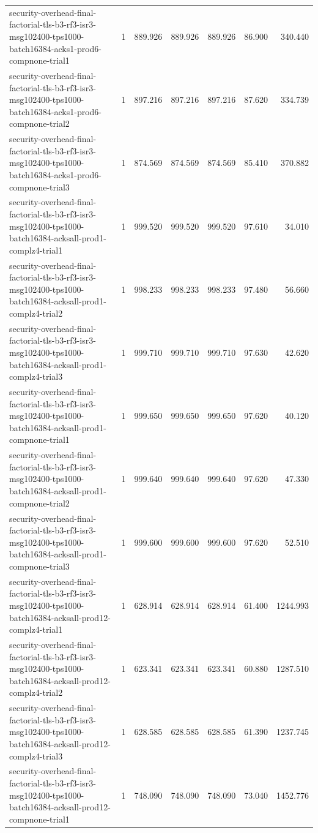 \begin{tabular}{lrrrrrr}
security-overhead-final-factorial-tls-b3-rf3-isr3-msg102400-tps1000-batch16384-acks1-prod6-compnone-trial1 & 1 & 889.926 & 889.926 & 889.926 & 86.900 & 340.440 \\
security-overhead-final-factorial-tls-b3-rf3-isr3-msg102400-tps1000-batch16384-acks1-prod6-compnone-trial2 & 1 & 897.216 & 897.216 & 897.216 & 87.620 & 334.739 \\
security-overhead-final-factorial-tls-b3-rf3-isr3-msg102400-tps1000-batch16384-acks1-prod6-compnone-trial3 & 1 & 874.569 & 874.569 & 874.569 & 85.410 & 370.882 \\
security-overhead-final-factorial-tls-b3-rf3-isr3-msg102400-tps1000-batch16384-acksall-prod1-complz4-trial1 & 1 & 999.520 & 999.520 & 999.520 & 97.610 & 34.010 \\
security-overhead-final-factorial-tls-b3-rf3-isr3-msg102400-tps1000-batch16384-acksall-prod1-complz4-trial2 & 1 & 998.233 & 998.233 & 998.233 & 97.480 & 56.660 \\
security-overhead-final-factorial-tls-b3-rf3-isr3-msg102400-tps1000-batch16384-acksall-prod1-complz4-trial3 & 1 & 999.710 & 999.710 & 999.710 & 97.630 & 42.620 \\
security-overhead-final-factorial-tls-b3-rf3-isr3-msg102400-tps1000-batch16384-acksall-prod1-compnone-trial1 & 1 & 999.650 & 999.650 & 999.650 & 97.620 & 40.120 \\
security-overhead-final-factorial-tls-b3-rf3-isr3-msg102400-tps1000-batch16384-acksall-prod1-compnone-trial2 & 1 & 999.640 & 999.640 & 999.640 & 97.620 & 47.330 \\
security-overhead-final-factorial-tls-b3-rf3-isr3-msg102400-tps1000-batch16384-acksall-prod1-compnone-trial3 & 1 & 999.600 & 999.600 & 999.600 & 97.620 & 52.510 \\
security-overhead-final-factorial-tls-b3-rf3-isr3-msg102400-tps1000-batch16384-acksall-prod12-complz4-trial1 & 1 & 628.914 & 628.914 & 628.914 & 61.400 & 1244.993 \\
security-overhead-final-factorial-tls-b3-rf3-isr3-msg102400-tps1000-batch16384-acksall-prod12-complz4-trial2 & 1 & 623.341 & 623.341 & 623.341 & 60.880 & 1287.510 \\
security-overhead-final-factorial-tls-b3-rf3-isr3-msg102400-tps1000-batch16384-acksall-prod12-complz4-trial3 & 1 & 628.585 & 628.585 & 628.585 & 61.390 & 1237.745 \\
security-overhead-final-factorial-tls-b3-rf3-isr3-msg102400-tps1000-batch16384-acksall-prod12-compnone-trial1 & 1 & 748.090 & 748.090 & 748.090 & 73.040 & 1452.776 \\

\end{tabular}

